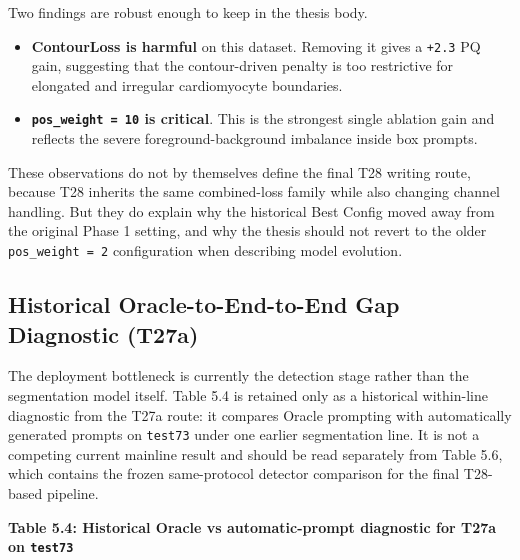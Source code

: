 Two findings are robust enough to keep in the thesis body.

\begin{itemize}
\tightlist
\item
  \textbf{ContourLoss is harmful} on this dataset. Removing it gives a \texttt{+2.3} PQ gain, suggesting that the contour-driven penalty is too restrictive for elongated and irregular cardiomyocyte boundaries.
\item
  \textbf{\texttt{pos\_weight\ =\ 10} is critical}. This is the strongest single ablation gain and reflects the severe foreground-background imbalance inside box prompts.
\end{itemize}

These observations do not by themselves define the final T28 writing route, because T28 inherits the same combined-loss family while also changing channel handling. But they do explain why the historical Best Config moved away from the original Phase 1 setting, and why the thesis should not revert to the older \texttt{pos\_weight\ =\ 2} configuration when describing model evolution.

\subsection{Historical Oracle-to-End-to-End Gap Diagnostic (T27a)}\label{oracle-to-end-to-end-gap-historical-t27a-reference}

The deployment bottleneck is currently the detection stage rather than the segmentation model itself. Table 5.4 is retained only as a historical within-line diagnostic from the T27a route: it compares Oracle prompting with automatically generated prompts on \texttt{test73} under one earlier segmentation line. It is not a competing current mainline result and should be read separately from Table 5.6, which contains the frozen same-protocol detector comparison for the final T28-based pipeline.

\textbf{Table 5.4: Historical Oracle vs automatic-prompt diagnostic for T27a on \texttt{test73}}

